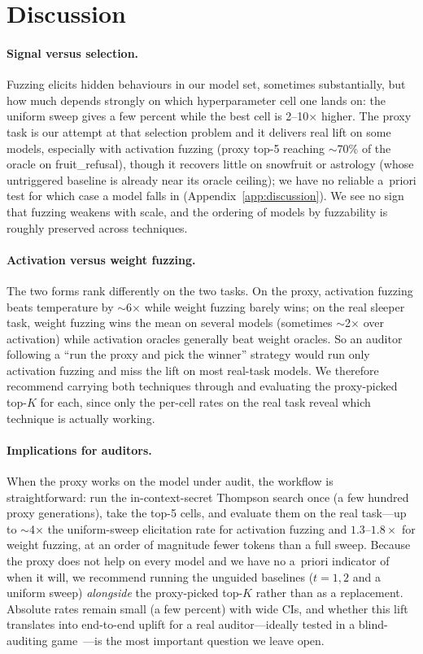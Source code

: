\documentclass{article}
\begin{document}
\section{Discussion}\label{ch:discussion}

\paragraph{Signal versus selection.} Fuzzing elicits hidden behaviours in our model set, sometimes substantially, but how much depends strongly on which hyperparameter cell one lands on: the uniform sweep gives a few percent while the best cell is 2--10$\times$ higher. The proxy task is our attempt at that selection problem and it delivers real lift on some models, especially with activation fuzzing (proxy top-5 reaching $\sim$70\% of the oracle on fruit\_refusal), though it recovers little on snowfruit or astrology (whose untriggered baseline is already near its oracle ceiling); we have no reliable a~priori test for which case a model falls in (Appendix~\ref{app:discussion}). We see no sign that fuzzing weakens with scale, and the ordering of models by fuzzability is roughly preserved across techniques.

\paragraph{Activation versus weight fuzzing.} The two forms rank differently on the two tasks. On the proxy, activation fuzzing beats temperature by $\sim$6$\times$ while weight fuzzing barely wins; on the real sleeper task, weight fuzzing wins the mean on several models (sometimes $\sim$2$\times$ over activation) while activation oracles generally beat weight oracles. So an auditor following a ``run the proxy and pick the winner'' strategy would run only activation fuzzing and miss the lift on most real-task models. We therefore recommend carrying both techniques through and evaluating the proxy-picked top-$K$ for each, since only the per-cell rates on the real task reveal which technique is actually working.

\paragraph{Implications for auditors.} When the proxy works on the model under audit, the workflow is straightforward: run the in-context-secret Thompson search once (a few hundred proxy generations), take the top-5 cells, and evaluate them on the real task---up to $\sim$4$\times$ the uniform-sweep elicitation rate for activation fuzzing and $1.3$--$1.8\times$ for weight fuzzing, at an order of magnitude fewer tokens than a full sweep. Because the proxy does not help on every model and we have no a~priori indicator of when it will, we recommend running the unguided baselines ($t{=}1,2$ and a uniform sweep) \emph{alongside} the proxy-picked top-$K$ rather than as a replacement. Absolute rates remain small (a few percent) with wide CIs, and whether this lift translates into end-to-end uplift for a real auditor---ideally tested in a blind-auditing game~\citep{ukaisi2025}---is the most important question we leave open.
\end{document}
